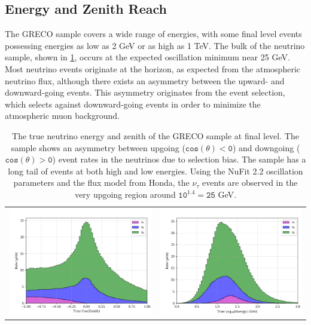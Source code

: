 \label{subsubsec:greco_truth}
\subsection{Energy and Zenith Reach}
The GRECO sample covers a wide range of energies, with some final level events possessing energies as low as 2 GeV or as high as 1 TeV.
The bulk of the neutrino sample, shown in \ref{fig:true_nuproperties}, occurs at the expected oscillation minimum near 25 GeV.
Most neutrino events originate at the horizon, as expected from the atmospheric neutrino flux, although there exists an asymmetry between the upward- and downward-going events.
This asymmetry originates from the event selection, which selects against downward-going events in order to minimize the atmospheric muon background.

\begin{center}
\begin{table}
\begin{tabular}{cc}
	\label{fig:gev_per_nch} \includegraphics[width=0.45\linewidth]{L7_true_coszen.png} &
	\label{fig:t_rms} \includegraphics[width=0.45\linewidth]{L7_true_logen.png} \\
\end{tabular}
\label{fig:true_nuproperties}
\caption{The true neutrino energy and zenith of the GRECO sample at final level. The sample shows an asymmetry between upgoing ($\mathtt{cos(\theta)<0}$) and downgoing ($\mathtt{cos(\theta)>0}$) event rates in the neutrinos due to selection bias. The sample has a long tail of events at both high and low energies. Using the NuFit 2.2 oscillation parameters and the flux model from Honda, the $\mathtt{\nu_\tau}$ events are observed in the very upgoing region around $\mathtt{10^1.4=25}$ GeV. }
\end{table}
\end{center}

